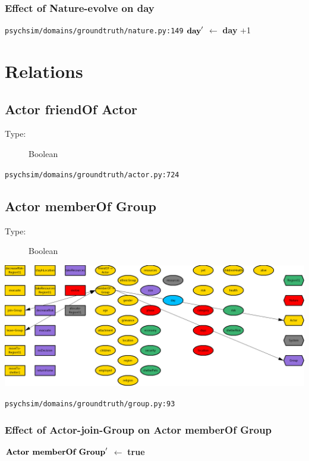 \documentclass{article}%
\begin{document}
\subsubsection{Effect of Nature{-}evolve on day}%
\label{ssubsec:Effect of Nature{-}evolve on day}%
\begin{flushleft}%
\verb|psychsim/domains/groundtruth/nature.py:149|%
\linebreak%
$\mbox{\textbf{day}} '$%
$\leftarrow$%
\textbf{day}%
+1%
\end{flushleft}

%
\section{Relations}%
\label{sec:Relations}%
\subsection{Actor friendOf Actor}%
\label{subsec:Actor friendOf Actor}%
\begin{description}%
\item[Type:]%
Boolean%
\end{description}%
\begin{flushleft}%
\verb|psychsim/domains/groundtruth/actor.py:724|%
\end{flushleft}

%
\subsection{Actor memberOf Group}%
\label{subsec:Actor memberOf Group}%
\begin{description}%
\item[Type:]%
Boolean%
\end{description}%
\includegraphics[width=\textwidth]{images/ActormemberOf->Group.png}%
\begin{flushleft}%
\verb|psychsim/domains/groundtruth/group.py:93|%
\end{flushleft}%
\subsubsection{Effect of Actor{-}join{-}Group on Actor memberOf Group}%
\label{ssubsec:Effect of Actor{-}join{-}Group on Actor memberOf Group}%
\begin{flushleft}%
$\mbox{\textbf{Actor memberOf Group}} '$%
$\leftarrow$%
\textbf{true}%
\end{flushleft}
\end{document}
